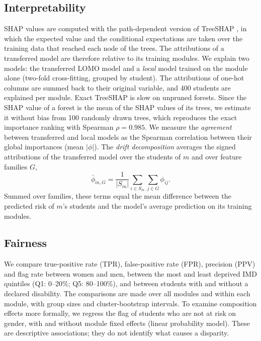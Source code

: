 \documentclass[journal]{IEEEtran}
\begin{document}
\subsection{Interpretability}
SHAP values \cite{lundberg2017shap} are computed with the path-dependent version of TreeSHAP \cite{lundberg2020treeshap}, in which the expected value and the conditional expectations are taken over the training data that reached each node of the trees. The attributions of a transferred model are therefore relative to its training modules. We explain two models: the transferred LOMO model and a \emph{local} model trained on the module alone (two-fold cross-fitting, grouped by student). The attributions of one-hot columns are summed back to their original variable, and 400 students are explained per module. Exact TreeSHAP is slow on unpruned forests. Since the SHAP value of a forest is the mean of the SHAP values of its trees, we estimate it without bias from 100 randomly drawn trees, which reproduces the exact importance ranking with Spearman $\rho=0.985$. We measure the \emph{agreement} between transferred and local models as the Spearman correlation between their global importances (mean $|\phi|$). The \emph{drift decomposition} averages the signed attributions of the transferred model over the students of $m$ and over feature families $G$,
\begin{equation}
\bar{\phi}_{m,G} = \frac{1}{|S_m|}\sum_{i\in S_m}\sum_{j\in G}\phi_{ij}.
\label{eq:decomp}
\end{equation}
Summed over families, these terms equal the mean difference between the predicted risk of $m$'s students and the model's average prediction on its training modules.

\subsection{Fairness}
We compare true-positive rate (TPR), false-positive rate (FPR), precision (PPV) and flag rate between women and men, between the most and least deprived IMD quintiles (Q1: 0--20\%; Q5: 80--100\%), and between students with and without a declared disability. The comparisons are made over all modules and within each module, with group sizes and cluster-bootstrap intervals. To examine composition effects more formally, we regress the flag of students who are not at risk on gender, with and without module fixed effects (linear probability model). These are descriptive associations; they do not identify what causes a disparity.
\end{document}
